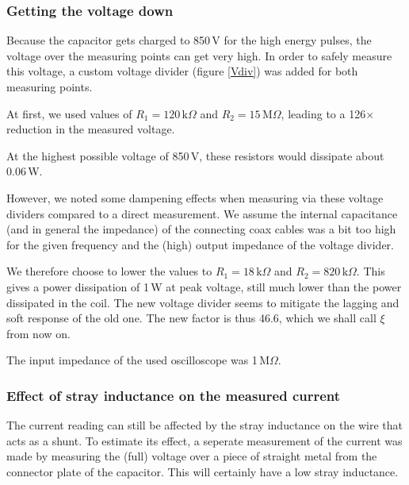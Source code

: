 \subsubsection{Getting the voltage down}
Because the capacitor gets charged to 850\,V for the high energy pulses, 
the voltage over the measuring points can get very high. In order to safely 
measure this voltage, a custom voltage divider (figure \ref{Vdiv}) was 
added for both measuring points.


At first, we used values of $R_1 = 120\,\mathrm{k}\Omega$ and $R_2 = 
15\,\mathrm{M}\Omega$, leading to a 126$\times$ reduction in the measured 
voltage.

At the highest possible voltage of 850\,V, these resistors would dissipate 
about 0.06\,W.

However, we noted some dampening effects when measuring via these voltage 
dividers compared to a direct measurement. We assume the internal 
capacitance (and in general the impedance) of the connecting coax cables 
was a bit too high for the given frequency and the (high) output impedance 
of the voltage divider.


We therefore choose to lower the values to $R_1 = 18\,\mathrm{k}\Omega$ and 
$R_2 = 820\,\mathrm{k}\Omega$. This gives a power dissipation of 1\,W at 
peak voltage, still much lower than the power dissipated in the coil.  The 
new voltage divider seems to mitigate the lagging and soft response of the 
old one. The new factor is thus 46.6, which we shall call $\xi$ from now 
on.






The input impedance of the used oscilloscope was 1\,M$\Omega$.



\subsubsection{Effect of stray inductance on the measured current}
The current reading can still be affected by the stray inductance on the 
wire that acts as a shunt. To estimate its effect, a seperate measurement 
of the current was made by measuring the (full) voltage over a piece of 
straight metal from the connector plate of the capacitor. This will 
certainly have a low stray inductance.

